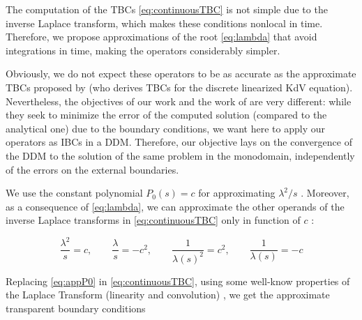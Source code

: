 \indent The computation of the TBCs \eqref{eq:continuousTBC} is not simple due to the inverse Laplace transform, which makes these conditions nonlocal in time. Therefore, we propose approximations of the root \eqref{eq:lambda} that avoid integrations in time, making the operators considerably simpler.

\indent Obviously,  \added[id=2017] we do not expect these operators to be as accurate as the approximate TBCs proposed by \cite{besse2015} (who derives TBCs for the discrete linearized KdV equation). Nevertheless, the objectives of our work and the work of \cite{besse2015} are very different: while they seek to minimize the error of the computed solution (compared to the analytical one) due to the boundary conditions, we want here to apply our  operators as IBCs in a DDM. Therefore, our objective lays on the convergence of the DDM to the solution of the same problem in the monodomain, independently of the errors on the external boundaries. 

\indent We use the constant polynomial $P_0(s) = c$ for approximating $\lambda^2/s$ . Moreover, as a consequence of \eqref{eq:lambda}, we can approximate the other operands of the inverse Laplace transforms in \eqref{eq:continuousTBC} only in function of $c$ :

\begin{equation}
	\label{eq:appP0}
	\frac{\lambda^2}{s}  = c, \qquad
	\frac{\lambda}{s}  = -c^2, \qquad
	\frac{1}{\lambda(s)^2}  = c^2, \qquad 
	 \frac{1}{\lambda(s)}  = -c 
\end{equation}

\indent Replacing \eqref{eq:appP0} in \eqref{eq:continuousTBC}, using some well-know properties of the Laplace Transform (linearity and convolution) , we get the approximate transparent boundary conditions


